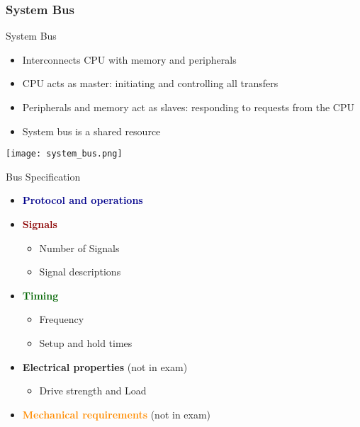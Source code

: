 \multend


\subsubsection{System Bus}

\begin{definition}{System Bus}
    \begin{itemize}
        \item Interconnects CPU with memory and peripherals
        \item CPU acts as master: initiating and controlling all transfers
        \item Peripherals and memory act as slaves: responding to requests from the CPU
        \item System bus is a shared resource
    \end{itemize}
    \texttt{[image: system\_bus.png]}
\end{definition}

\begin{concept}{Bus Specification}
    \begin{itemize}
        \item \textcolor{darkblue}{\textbf{Protocol and operations}}
        \item \textcolor{darkred}{\textbf{Signals}}
        \begin{itemize}
            \item Number of Signals
            \item Signal descriptions
        \end{itemize}
        \item \textcolor{darkgreen}{\textbf{Timing}}
        \begin{itemize}
            \item Frequency
            \item Setup and hold times
        \end{itemize}
        \item \textcolor{darkpurple}{\textbf{Electrical properties}} (not in exam)
        \begin{itemize}
            \item Drive strength and Load
        \end{itemize}
        \item \textcolor{darkorange}{\textbf{Mechanical requirements}} (not in exam)
    \end{itemize}
\end{concept}


